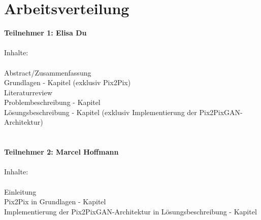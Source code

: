 \chapter*{Arbeitsverteilung}

\textbf{Teilnehmer 1:  Elisa Du} \\
\\
 Inhalte: \\
\\ Abstract/Zusammenfassung
\\ Grundlagen - Kapitel (exklusiv Pix2Pix)
\\ Literaturreview
\\ Problembeschreibung - Kapitel
\\ Lösungsbeschreibung - Kapitel (exklusiv Implementierung der Pix2PixGAN-Architektur)
\\ 
\\
\\
\textbf{Teilnehmer 2: Marcel Hoffmann} \\
\\
 Inhalte: \\
\\ Einleitung
\\ Pix2Pix in Grundlagen - Kapitel
\\ Implementierung der Pix2PixGAN-Architektur in Lösungsbeschreibung - Kapitel
\\ 
\\
\\
